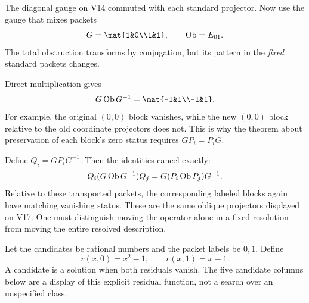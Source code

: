 
The diagonal gauge on V14 commuted with each standard projector. Now use the gauge that mixes packets
\[
G=\mat{1&0\\1&1},\qquad \Ob=E_{01}.
\]
The total obstruction transforms by conjugation, but its pattern in the \emph{fixed} standard packets changes.


Direct multiplication gives
\[
G\Ob G^{-1}=\mat{-1&1\\-1&1}.
\]
For example, the original $(0,0)$ block vanishes, while the new $(0,0)$ block relative to the old coordinate projectors does not. This is why the theorem about preservation of each block's zero status requires $G P_i=P_iG$.

Define $Q_i=GP_iG^{-1}$. Then the identities cancel exactly:
\[
Q_i(G\operatorname{Ob} G^{-1})Q_j=G(P_i\operatorname{Ob} P_j)G^{-1}.
\]
Relative to these transported packets, the corresponding labeled blocks again have matching vanishing status. These are the same oblique projectors displayed on V17. One must distinguish moving the operator alone in a fixed resolution from moving the entire resolved description.


Let the candidates be rational numbers and the packet labels be $0,1$. Define
\[
r(x,0)=x^2-1,\qquad r(x,1)=x-1.
\]
A candidate is a solution when both residuals vanish. The five candidate columns below are a display of this explicit residual function, not a search over an unspecified class.


